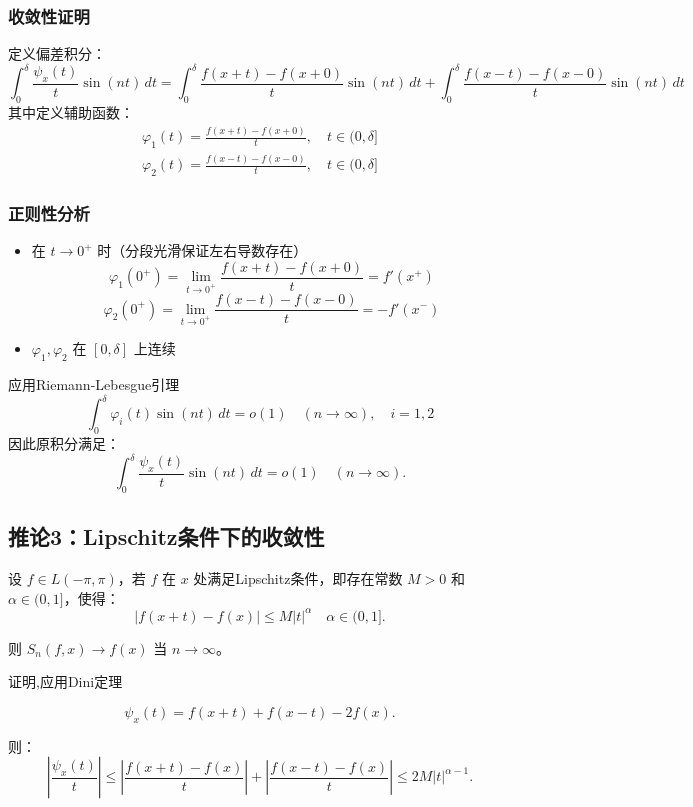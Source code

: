 \documentclass[12pt]{article}
\begin{document}
	\subsubsection{收敛性证明}
	定义偏差积分：
	\[
	\int_0^\delta \frac{\psi_x(t)}{t} \sin(nt) \, dt = \int_0^\delta \frac{f(x+t)-f(x+0)}{t} \sin(nt) \, dt + \int_0^\delta \frac{f(x-t)-f(x-0)}{t} \sin(nt) \, dt
	\]
	其中定义辅助函数：
	\[
	\begin{aligned}
		\varphi_1(t) = \frac{f(x+t)-f(x+0)}{t}, \quad t \in (0, \delta] \\
		\varphi_2(t) = \frac{f(x-t)-f(x-0)}{t}, \quad t \in (0, \delta]
	\end{aligned}
	\]
	
	\subsubsection{正则性分析}
	\begin{itemize}
		\item 在 $t \to 0^+$ 时（分段光滑保证左右导数存在）
		\[
		\varphi_1(0^+) = \lim_{t \to 0^+} \frac{f(x+t)-f(x+0)}{t} = f'(x^+)
		\]
		\[
		\varphi_2(0^+) = \lim_{t \to 0^+} \frac{f(x-t)-f(x-0)}{t} = -f'(x^-)
		\]
		\item $\varphi_1, \varphi_2$ 在 $[0, \delta]$ 上连续
	\end{itemize}
	
	应用Riemann-Lebesgue引理
	\[
	\int_0^\delta \varphi_i(t) \sin(nt) \, dt = o(1) \quad (n \to \infty),\quad i=1,2
	\]
	因此原积分满足：
	\[
	\int_0^\delta \frac{\psi_x(t)}{t} \sin(nt) \, dt = o(1) \quad (n \to \infty).
	\]
	
	
	
	
	\subsection{推论3：Lipschitz条件下的收敛性}
	
	设 \( f \in L(-\pi, \pi) \)，若 \( f \) 在 \( x \) 处满足Lipschitz条件，即存在常数 \( M > 0 \) 和 \( \alpha \in (0, 1] \)，使得：
	\[
	|f(x+t) - f(x)| \leq M |t|^\alpha \quad  \alpha \in (0, 1].
	\]
	
	则 \( S_n(f, x) \to f(x) \) 当 \( n \to \infty \)。
	
证明,应用Dini定理

	\[
	\psi_x(t) = f(x+t) + f(x-t) - 2f(x).
	\]
	
	则：
	\[
	\left| \frac{\psi_x(t)}{t} \right| \leq \left| \frac{f(x+t) - f(x)}{t} \right| + \left| \frac{f(x-t) - f(x)}{t} \right| \leq 2M |t|^{\alpha - 1}.
	\]
	
\end{document}
